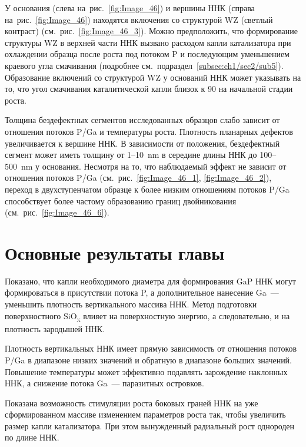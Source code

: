 У основания (слева на~рис.~\cref{fig:Image_46}) и вершины ННК (справа на~рис.~\cref{fig:Image_46}) находятся включения со структурой WZ (светлый контраст) (см.~рис.~\cref{fig:Image_46_3}). Можно предположить, что формирование структуры WZ в верхней части ННК вызвано расходом капли катализатора при охлаждении образца после роста под потоком P и последующим уменьшением краевого угла смачивания (подробнее см.~подраздел~\cref{subsec:ch1/sec2/sub5}). Образование включений со структурой WZ у оснований ННК может указывать на то, что угол смачивания каталитической капли близок к 90{\textdegree} на начальной стадии роста.

Толщина бездефектных сегментов исследованных образцов слабо зависит от отношения потоков P/Ga и температуры роста. Плотность планарных дефектов увеличивается к вершине ННК. В зависимости от положения, бездефектный сегмент может иметь толщину от 1--10~\si{\nano\meter} в середине длины ННК до 100--500~\si{\nano\meter} у основания. Несмотря на то, что наблюдаемый эффект не зависит от отношения потоков P/Ga (см.~рис.~\cref{fig:Image_46_1}, \cref{fig:Image_46_2}), переход в двухступенчатом образце к более низким отношениям потоков P/Ga способствует более частому образованию границ двойникования (см.~рис.~\cref{fig:Image_46_6}).

\section{Основные результаты главы}\label{sec:ch6/sec3}

Показано, что капли необходимого диаметра для формирования GaP ННК могут формироваться в присутствии потока P, а дополнительное нанесение Ga~--- уменьшить плотность вертикального массива ННК. Метод подготовки поверхностного SiO\textsubscript{x} влияет на поверхностную энергию, а следовательно, и на плотность зародышей ННК.

Плотность вертикальных ННК имеет прямую зависимость от отношения потоков P/Ga в диапазоне низких значений и обратную в диапазоне больших значений. Повышение температуры может эффективно подавлять зарождение наклонных ННК, а снижение потока Ga~--- паразитных островков.

Показана возможность стимуляции роста боковых граней ННК на уже сформированном массиве изменением параметров роста так, чтобы увеличить размер капли катализатора. При этом вынужденный радиальный рост однороден по длине ННК.

\FloatBarrier
